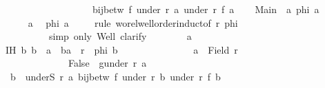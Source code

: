 \begin{isabellebody}
\ \ \ \ \ \ \ \ \ \ \ \ \ \ \ \ \ \ \ bij{\isacharunderscore}{\kern0pt}betw\ f\ {\isacharparenleft}{\kern0pt}under\ r\ a{\isacharparenright}{\kern0pt}\ {\isacharparenleft}{\kern0pt}under\ r{\isacharprime}{\kern0pt}\ {\isacharparenleft}{\kern0pt}f\ a{\isacharparenright}{\kern0pt}{\isacharparenright}{\kern0pt}{\isachardoublequoteclose}\isanewline
\ \ \isamarkupfalse%
\ Main{}{\isacharcolon}{\kern0pt}\ {\isachardoublequoteopen}{\isasymAnd}\ a{\isachardot}{\kern0pt}\ {\isacharquery}{\kern0pt}phi\ a{\isachardoublequoteclose}\isanewline
\ \ \isamarkupfalse%
{\isacharminus}{\kern0pt}\isanewline
\ \ \ \ \isamarkupfalse%
\ a\ \isamarkupfalse%
\ {\isachardoublequoteopen}{\isacharquery}{\kern0pt}phi\ a{\isachardoublequoteclose}\isanewline
\ \ \ \ \isamarkupfalse%
{\isacharparenleft}{\kern0pt}rule\ wo{\isacharunderscore}{\kern0pt}rel{\isachardot}{\kern0pt}well{\isacharunderscore}{\kern0pt}order{\isacharunderscore}{\kern0pt}induct{\isacharbrackleft}{\kern0pt}of\ r\ {\isacharquery}{\kern0pt}phi{\isacharbrackright}{\kern0pt}{\isacharcomma}{\kern0pt}\isanewline
\ \ \ \ \ \ \ \ \ \ simp\ only{\isacharcolon}{\kern0pt}\ Well{\isacharcomma}{\kern0pt}\ clarify{\isacharparenright}{\kern0pt}\isanewline
\ \ \ \ \ \ \isamarkupfalse%
\ a\isanewline
\ \ \ \ \ \ \isamarkupfalse%
\ IH{\isacharcolon}{\kern0pt}\ {\isachardoublequoteopen}{\isasymforall}b{\isachardot}{\kern0pt}\ b\ {\isasymnoteq}\ a\ {\isasymand}\ {\isacharparenleft}{\kern0pt}b{\isacharcomma}{\kern0pt}a{\isacharparenright}{\kern0pt}\ {\isasymin}\ r\ {\isasymlongrightarrow}\ {\isacharquery}{\kern0pt}phi\ b{\isachardoublequoteclose}\ \isanewline
\ \ \ \ \ \ \ \ \ \ \ \ \ {\isacharasterisk}{\kern0pt}{\isacharcolon}{\kern0pt}\ {\isachardoublequoteopen}a\ {\isasymin}\ Field\ r{\isachardoublequoteclose}\ \isanewline
\ \ \ \ \ \ \ \ \ \ \ \ \ {\isacharasterisk}{\kern0pt}{\isacharasterisk}{\kern0pt}{\isacharcolon}{\kern0pt}\ {\isachardoublequoteopen}False\ {\isasymnotin}\ g{\isacharbackquote}{\kern0pt}{\isacharparenleft}{\kern0pt}under\ r\ a{\isacharparenright}{\kern0pt}{\isachardoublequoteclose}\isanewline
\ \ \ \ \ \ \isamarkupfalse%
\ {}{\isacharcolon}{\kern0pt}\ {\isachardoublequoteopen}{\isasymforall}b\ {\isasymin}\ underS\ r\ a{\isachardot}{\kern0pt}\ bij{\isacharunderscore}{\kern0pt}betw\ f\ {\isacharparenleft}{\kern0pt}under\ r\ b{\isacharparenright}{\kern0pt}\ {\isacharparenleft}{\kern0pt}under\ r{\isacharprime}{\kern0pt}\ {\isacharparenleft}{\kern0pt}f\ b{\isacharparenright}{\kern0pt}{\isacharparenright}{\kern0pt}{\isachardoublequoteclose}\isanewline

\end{isabellebody}
